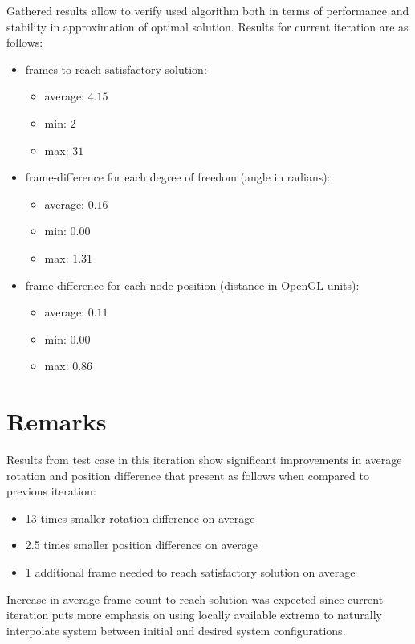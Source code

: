 \documentclass[]{report}
\begin{document}
\noindent Gathered results allow to verify used algorithm both in terms of performance and 
stability in approximation of optimal solution. Results for current iteration are as follows:

\begin{itemize}
	\item frames to reach satisfactory solution: 
	\begin{itemize}
		\item average: $4.15$ 
		\item min: $2$
		\item max: $31$
	\end{itemize}
	\item frame-difference for each degree of freedom (angle in radians): 
	\begin{itemize}
		\item average: $0.16$
		\item min: $0.00$
		\item max: $1.31$
	\end{itemize}
	\item frame-difference for each node position (distance in OpenGL units):
	\begin{itemize}
		\item  average: $0.11$ 
		\item min: $0.00$ 
		\item max: $0.86$
	\end{itemize}
\end{itemize}


\chapter*{Remarks}
\noindent Results from test case in this iteration show significant improvements in average rotation and position difference that present as follows when compared to previous iteration:
\begin{itemize}
	\item 13 times smaller rotation difference on average
	\item 2.5 times smaller position difference on average
	\item 1 additional frame needed to reach satisfactory solution on average
\end{itemize}

\noindent Increase in average frame count to reach solution was expected since current iteration puts more emphasis on using locally available extrema to naturally interpolate system between initial and desired system configurations.\\
\end{document}

